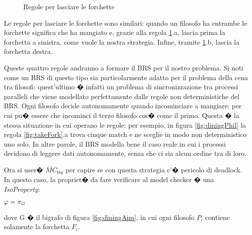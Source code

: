 \begin{figure}[th]
{
}
\caption{Regole per lasciare le forchette \label{fig:dropFork}}
\end{figure}



Le regole per lasciare le forchette sono similari: quando un filosofo ha entrambe le forchette significa che ha mangiato e, grazie alla regola \ref{fig:dropFork}.a, lascia prima la forchetta a sinistra, come vuole la nostra strategia. Infine, tramite \ref{fig:dropFork}.b, lascia la forchetta destra.

Queste quattro regole andranno a formare il BRS per il nostro problema. Si noti come un BRS di questo tipo sia particolarmente adatto per il problema della cena tra filosofi: quest'ultimo � infatti un problema di sincronizzazione tra processi paralleli che viene modellato perfettamente dalle regole non deterministiche del BRS. Ogni filosofo decide autonomamente quando incominciare a mangiare: per cui pu� essere che incominci il terzo filosofo cos� come il primo. Questa � la stessa situazione in cui operano le regole: per esempio, in figura \ref{fig:diningPhil} la regola \ref{fig:takeFork}.a trova cinque match e ne sceglie in modo non deterministico uno solo. In altre parole, il BRS modella bene il caso reale in cui i processi decidono di leggere dati autonomamente, senza che ci sia alcun ordine tra di loro.

Ora si user� $MC_{big}$ per capire se con questa strategia c'� pericolo di deadlock. In questo caso, la propriet� da fare verificare al model checker � una \emph{IsoProperty}:
\begin{center}
$\varphi =  \pi_G$
\end{center}
dove G � il bigrafo di figura \ref{fig:diningAim}, in cui ogni filosofo $P_i$ contiene solamente la forchetta $F_i$.


